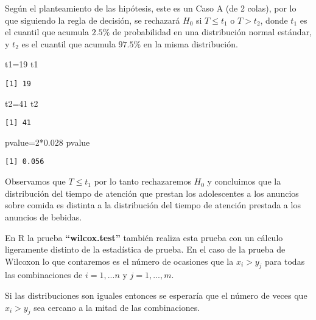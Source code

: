 \documentclass[
  a4paper,
  oneside,
  openany]{book}
\newenvironment{Shaded}{\begin{snugshade}}{\end{snugshade}}
\newcommand{\DecValTok}[1]{\textcolor[rgb]{0.00,0.00,0.81}{#1}}
\newcommand{\FloatTok}[1]{\textcolor[rgb]{0.00,0.00,0.81}{#1}}
\newcommand{\NormalTok}[1]{#1}
\newcommand{\OtherTok}[1]{\textcolor[rgb]{0.56,0.35,0.01}{#1}}
\newcommand{\SpecialCharTok}[1]{\textcolor[rgb]{0.00,0.00,0.00}{#1}}
\begin{document}
Según el planteamiento de las hipótesis, este es un Caso A (de 2 colas), por lo que siguiendo la regla de decisión, se rechazará \(H_0\) si \(T \leq t_1\) o \(T> t_2\), donde \(t_1\) es el cuantil que acumula \(2.5\%\) de probabilidad en una distribución normal estándar, y \(t_2\) es el cuantil que acumula \(97.5\%\) en la misma distribución.

\begin{Shaded}
\begin{Highlighting}[]
\NormalTok{t1}\OtherTok{=}\DecValTok{19}
\NormalTok{t1}
\end{Highlighting}
\end{Shaded}

\begin{verbatim}
[1] 19
\end{verbatim}

\begin{Shaded}
\begin{Highlighting}[]
\NormalTok{t2}\OtherTok{=}\DecValTok{41}
\NormalTok{t2}
\end{Highlighting}
\end{Shaded}

\begin{verbatim}
[1] 41
\end{verbatim}

\begin{Shaded}
\begin{Highlighting}[]
\NormalTok{pvalue}\OtherTok{=}\DecValTok{2}\SpecialCharTok{*}\FloatTok{0.028}
\NormalTok{pvalue}
\end{Highlighting}
\end{Shaded}

\begin{verbatim}
[1] 0.056
\end{verbatim}

Observamos que \(T \leq t_1\) por lo tanto rechazaremos \(H_0\) y concluimos que la distribución del tiempo de atención que prestan los adolescentes a los anuncios sobre comida es distinta a la distribución del tiempo de atención prestada a los anuncios de bebidas.

En R la prueba \textbf{``wilcox.test''} también realiza esta prueba con un cálculo ligeramente distinto de la estadística de prueba. En el caso de la prueba de Wilcoxon lo que contaremos es el número de ocasiones que la \(x_i>y_j\) para todas las combinaciones de \(i=1,...n\) y \(j=1,...,m\).

Si las distribuciones son iguales entonces se esperaría que el número de veces que \(x_i>y_j\) sea cercano a la mitad de las combinaciones.
\end{document}
